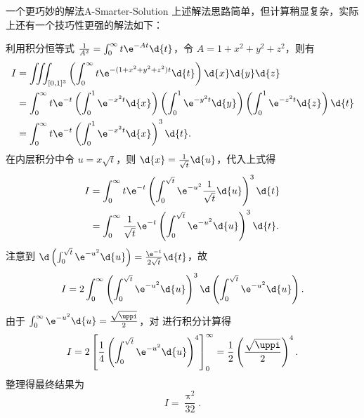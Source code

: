 \begin{note}{一个更巧妙的解法}{A-Smarter-Solution}
    {\kaishu 上述解法思路简单，但计算稍显复杂，实际上还有一个技巧性更强的解法如下：}
    \begin{solution}
        利用积分恒等式 $\frac{1}{A^2} = \int_{0}^{\infty} t \e^{-At} \d{t}$，令 $A = 1 + x^2 + y^2 + z^2$，则有
        \begin{equation}
            \begin{aligned}
                I & = \iiint_{[0,1]^3} \left( \int_{0}^{\infty} t \e^{-(1+x^2+y^2+z^2)t} \d{t} \right) \d{x} \d{y} \d{z}                                                                          \\
                  & = \int_{0}^{\infty} t \e^{-t} \left( \int_{0}^{1} \e^{-x^2 t} \d{x} \right) \left( \int_{0}^{1} \e^{-y^2 t} \d{y} \right) \left( \int_{0}^{1} \e^{-z^2 t} \d{z} \right) \d{t} \\
                  & = \int_{0}^{\infty} t \e^{-t} \left( \int_{0}^{1} \e^{-x^2 t} \d{x} \right)^3 \d{t}.
            \end{aligned}
        \end{equation}
        在内层积分中令 $u = x\sqrt{t}$，则 $\d{x} = \frac{1}{\sqrt{t}} \d{u}$，代入上式得
        \begin{equation}
            \begin{aligned}
                I & = \int_{0}^{\infty} t \e^{-t} \left( \int_{0}^{\sqrt{t}} \e^{-u^2} \frac{1}{\sqrt{t}} \d{u} \right)^3 \d{t} \\
                  & = \int_{0}^{\infty} \frac{1}{\sqrt{t}} \e^{-t} \left( \int_{0}^{\sqrt{t}} \e^{-u^2} \d{u} \right)^3 \d{t}.
            \end{aligned}
        \end{equation}
        注意到 $\d \left( \int_{0}^{\sqrt{t}} \e^{-u^2} \d{u} \right) = \frac{\e^{-t}}{2\sqrt{t}} \d{t}$，故
        \begin{equation}
            I = 2 \int_{0}^{\infty} \left( \int_{0}^{\sqrt{t}} \e^{-u^2} \d{u} \right)^3 \d \left( \int_{0}^{\sqrt{t}} \e^{-u^2} \d{u} \right). \label{eq:Integral-Form}
        \end{equation}
        由于 $\int_{0}^{\infty} \e^{-u^2} \d{u} = \frac{\sqrt{\uppi}}{2}$，对  进行积分计算得
        \begin{equation}
            I = 2 \left[ \frac{1}{4} \left( \int_{0}^{\sqrt{t}} \e^{-u^2} \d{u} \right)^4 \right]_{0}^{\infty} = \frac{1}{2} \left( \frac{\sqrt{\uppi}}{2} \right)^4.
        \end{equation}
        整理得最终结果为
        \begin{equation}
            \boxed{I = \frac{\uppi^2}{32}}.
        \end{equation}
    \end{solution}

\end{note}

